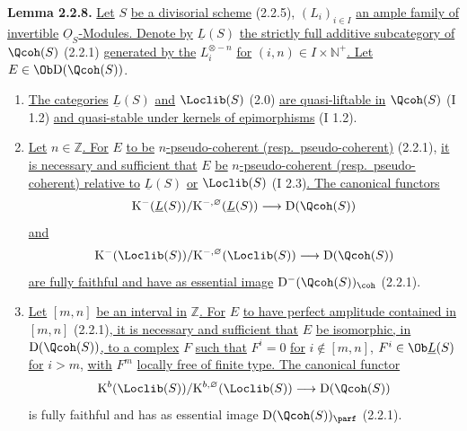 \textbf{Lemma 2.2.8.} \uline{Let} $S$ \uline{be a divisorial scheme} (2.2.5), $(L_i)_{i\in I}$ \uline{an ample family of invertible} $\underline{O}_S$\uline{-Modules. Denote by} $\underline{L}(S)$ \uline{the strictly full additive subcategory of} $\Qcoh(S)$ (2.2.1) \uline{generated by the} $L_i^{\otimes-n}$ \uline{for} $(i,n)\in I\times\mathbb N^+$\uline{. Let} $E\in\Ob\mathrm D(\Qcoh(S))$.
\begin{enumerate}[label=\alph*)]
\item \uline{The categories} $\underline{L}(S)$ \uline{and} $\Loclib(S)$ (2.0) \uline{are quasi-liftable in} $\Qcoh(S)$ (I 1.2) \uline{and quasi-stable under kernels of epimorphisms} (I 1.2).
\item \uline{Let} $n\in\mathbb Z$\uline{. For} $E$ \uline{to be} $n$\uline{-pseudo-coherent (resp.\ pseudo-coherent)} (2.2.1), \uline{it is necessary and sufficient that} $E$ \uline{be} $n$\uline{-pseudo-coherent (resp.\ pseudo-coherent) relative to} $\underline{L}(S)$ \uline{or} $\Loclib(S)$ (I 2.3)\uline{. The canonical functors}
\[
\mathrm K^{-}(\underline{L}(S))/\mathrm K^{-,\varnothing}(\underline{L}(S))\longrightarrow \mathrm D(\Qcoh(S))
\]
\uline{and}
\[
\mathrm K^{-}(\Loclib(S))/\mathrm K^{-,\varnothing}(\Loclib(S))\longrightarrow \mathrm D(\Qcoh(S))
\]
\uline{are fully faithful and have as essential image} $\mathrm D^{-}(\Qcoh(S))_{\coh}$ (2.2.1).
\item \uline{Let} $[m,n]$ \uline{be an interval in} $\mathbb Z$\uline{. For} $E$ \uline{to have perfect amplitude contained in} $[m,n]$ (2.2.1)\uline{, it is necessary and sufficient that} $E$ \uline{be isomorphic, in} $\mathrm D(\Qcoh(S))$\uline{, to a complex} $F$ \uline{such that} $F^i=0$ \uline{for} $i\notin[m,n]$, $F^i\in\Ob \underline{L}(S)$ \uline{for} $i>m$, \uline{with} $F^m$ \uline{locally free of finite type. The canonical functor}
\[
\mathrm K^b(\Loclib(S))/\mathrm K^{b,\varnothing}(\Loclib(S))\longrightarrow \mathrm D(\Qcoh(S))
\]
%
is
fully faithful and has as essential image $\mathrm D(\Qcoh(S))_{\parf}$ (2.2.1).
\end{enumerate}

